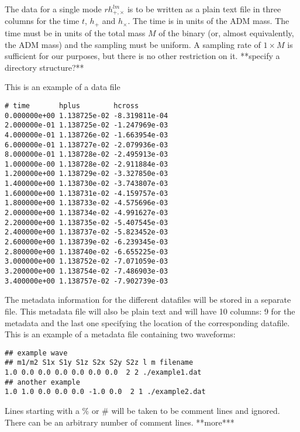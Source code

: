 \documentclass[amsmath,amssymb]{article}
\begin{document}
The data for a single mode $rh_{+,\times}^{lm}$ is to be written as a
plain text file in three columns for the time $t$, $h_+$ and
$h_\times$.  The time is in units of the ADM mass. The time must be in
units of the total mass $M$ of the binary (or, almost equivalently,
the ADM mass) and the sampling must be uniform.  A sampling rate of
$1\times M$ is sufficient for our purposes, but there is no other
restriction on it. **specify a directory structure?**

This is an example of a data file 
\begin{verbatim}
# time       hplus        hcross
0.000000e+00 1.138725e-02 -8.319811e-04
2.000000e-01 1.138725e-02 -1.247969e-03
4.000000e-01 1.138726e-02 -1.663954e-03
6.000000e-01 1.138727e-02 -2.079936e-03
8.000000e-01 1.138728e-02 -2.495913e-03
1.000000e-00 1.138728e-02 -2.911884e-03
1.200000e+00 1.138729e-02 -3.327850e-03
1.400000e+00 1.138730e-02 -3.743807e-03
1.600000e+00 1.138731e-02 -4.159757e-03
1.800000e+00 1.138733e-02 -4.575696e-03
2.000000e+00 1.138734e-02 -4.991627e-03
2.200000e+00 1.138735e-02 -5.407545e-03
2.400000e+00 1.138737e-02 -5.823452e-03
2.600000e+00 1.138739e-02 -6.239345e-03
2.800000e+00 1.138740e-02 -6.655225e-03
3.000000e+00 1.138752e-02 -7.071059e-03
3.200000e+00 1.138754e-02 -7.486903e-03
3.400000e+00 1.138757e-02 -7.902739e-03
\end{verbatim}

The metadata information for the different datafiles will be stored in
a separate file.  This metadata file will also be plain text and
will have 10 columns: 9 for the metadata and the last one specifying
the location of the corresponding datafile.  This is an example of a
metadata file containing two waveforms:
\begin{verbatim}
## example wave
## m1/m2 S1x S1y S1z S2x S2y S2z l m filename
1.0 0.0 0.0 0.0 0.0 0.0 0.0  2 2 ./example1.dat
## another example
1.0 1.0 0.0 0.0 0.0 -1.0 0.0  2 1 ./example2.dat
\end{verbatim}
Lines starting with a $\%$ or $\#$ will be taken to be comment lines and
ignored. There can be an arbitrary number of comment lines.  **more***
\end{document}
